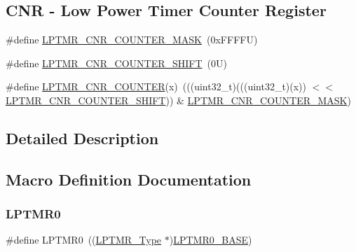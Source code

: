\subsection*{C\+NR -\/ Low Power Timer Counter Register}
\begin{DoxyCompactItemize}
\item 
\#define \mbox{\hyperlink{group___l_p_t_m_r___register___masks_ga134708aff0fe3bd31d703e32966c08fc}{L\+P\+T\+M\+R\+\_\+\+C\+N\+R\+\_\+\+C\+O\+U\+N\+T\+E\+R\+\_\+\+M\+A\+SK}}~(0x\+F\+F\+F\+F\+U)
\item 
\#define \mbox{\hyperlink{group___l_p_t_m_r___register___masks_ga3769a974a3d95250e32bb154fa134c3f}{L\+P\+T\+M\+R\+\_\+\+C\+N\+R\+\_\+\+C\+O\+U\+N\+T\+E\+R\+\_\+\+S\+H\+I\+FT}}~(0\+U)
\item 
\#define \mbox{\hyperlink{group___l_p_t_m_r___register___masks_ga8732990b7f3af802120a5e95000c963f}{L\+P\+T\+M\+R\+\_\+\+C\+N\+R\+\_\+\+C\+O\+U\+N\+T\+ER}}(x)~(((uint32\+\_\+t)(((uint32\+\_\+t)(x)) $<$$<$ \mbox{\hyperlink{group___l_p_t_m_r___register___masks_ga3769a974a3d95250e32bb154fa134c3f}{L\+P\+T\+M\+R\+\_\+\+C\+N\+R\+\_\+\+C\+O\+U\+N\+T\+E\+R\+\_\+\+S\+H\+I\+FT}})) \& \mbox{\hyperlink{group___l_p_t_m_r___register___masks_ga134708aff0fe3bd31d703e32966c08fc}{L\+P\+T\+M\+R\+\_\+\+C\+N\+R\+\_\+\+C\+O\+U\+N\+T\+E\+R\+\_\+\+M\+A\+SK}})
\end{DoxyCompactItemize}


\subsection{Detailed Description}


\subsection{Macro Definition Documentation}
\mbox{\label{group___l_p_t_m_r___register___masks_gaba0c3bc8a32ad5a884c99e019dbdef85}} 
\subsubsection{\texorpdfstring{L\+P\+T\+M\+R0}{LPTMR0}}
{\footnotesize\ttfamily \#define L\+P\+T\+M\+R0~((\mbox{\hyperlink{struct_l_p_t_m_r___type}{L\+P\+T\+M\+R\+\_\+\+Type}} $\ast$)\mbox{\hyperlink{group___l_p_t_m_r___register___masks_ga024f362857a8b928d96cf3b3f5106793}{L\+P\+T\+M\+R0\+\_\+\+B\+A\+SE}})}

